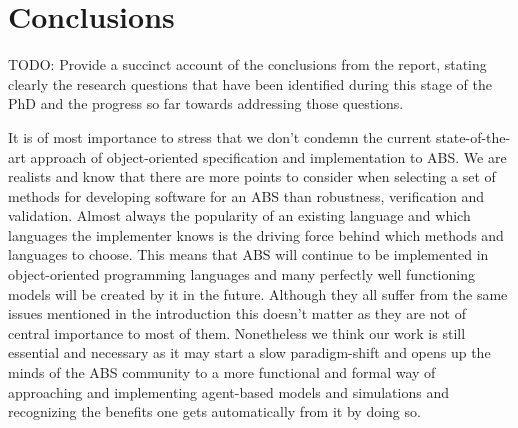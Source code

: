 \chapter{Conclusions}
TODO: Provide a succinct account of the conclusions from the report, stating clearly the research questions that have been identified during this stage of the PhD and the progress so far towards addressing those questions.

It is of most importance to stress that we don't condemn the current state-of-the-art approach of object-oriented specification and implementation to ABS. We are realists and know that there are more points to consider when selecting a set of methods for developing software for an ABS than robustness, verification and validation. Almost always the popularity of an existing language and which languages the implementer knows is the driving force behind which methods and languages to choose. This means that ABS will continue to be implemented in object-oriented programming languages and many perfectly well functioning models will be created by it in the future. Although they all suffer from the same issues mentioned in the introduction this doesn't matter as they are not of central importance to most of them.
Nonetheless we think our work is still essential and necessary as it may start a slow paradigm-shift and opens up the minds of the ABS community to a more functional and formal way of approaching and implementing agent-based models and simulations and recognizing the benefits one gets automatically from it by doing so.